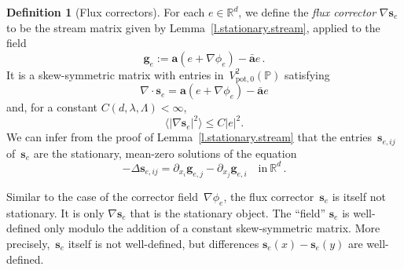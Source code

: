 \documentclass[11pt]{article} %
\numberwithin{equation}{section}
\theoremstyle{definition}
\newtheorem{definition}[theorem]{Definition}
\newcommand*{\Rd}{\ensuremath{\mathbb{R}^d}}
\newcommand{\g}{\mathbf{g}}
\newcommand{\s}{\mathbf{s}}
\newcommand{\pot}{\mathrm{pot}}
\renewcommand{\a}{\mathbf{a}}
\newcommand{\ahom}{\bar{\a}}
\renewcommand{\P}{\mathbb{P}}
\begin{document}
 
\begin{definition}[Flux correctors]
For each $e\in\Rd$, we define the \emph{flux corrector} $\nabla \s_{e}$ to be the stream matrix given by Lemma~\ref{l.stationary.stream}, applied to the field
\begin{equation}
\label{e.ge.def}
\g_e := \a(e+\nabla \phi_e) - \ahom e \,.
\end{equation}
It is a skew-symmetric matrix with entries in~$V^2_{\pot,0}(\P)$ satisfying
\begin{equation}
\label{e.fluxcorrect.yes}
\nabla \cdot \s_e = \a(e+\nabla \phi_e) - \ahom e
\end{equation}
and, for a constant $C(d,\lambda,\Lambda)<\infty$, 
\begin{equation}
\big\langle | \nabla \s_{e} |^2 \big\rangle 
\leq C|e|^2. 
\end{equation}
We can infer from the proof of Lemma~\ref{l.stationary.stream} that the entries~$\s_{e,ij}$ of~$\s_e$ are the stationary, mean-zero solutions of the equation
\begin{equation}
\label{e.flux.se.eq}
-\Delta \s_{e,ij}
=
\partial_{x_i} \g_{e,j}
-
\partial_{x_j} \g_{e,i}
\quad \mbox{in} \ \Rd
\,.
\end{equation}
\end{definition}
Similar to the case of the corrector field~$\nabla\phi_e$, the flux corrector~$\s_e$ is itself not stationary. It is only $\nabla \s_e$ that is the stationary object. The ``field'' $\s_e$ is well-defined only modulo the addition of a constant skew-symmetric matrix. More precisely,~$\s_e$ itself is not well-defined, but differences $\s_e(x) - \s_e(y)$ are well-defined. 

\smallskip
\end{document}
